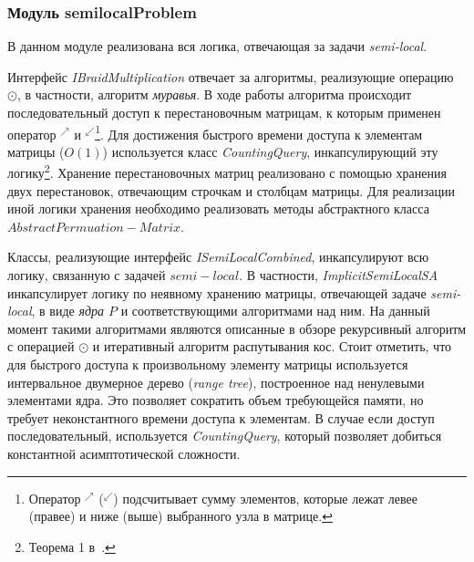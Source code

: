 \subsubsection{Модуль semilocalProblem}
В данном модуле реализована вся логика, отвечающая за задачи \emph{semi-local}.

Интерфейс \emph{IBraidMultiplication} отвечает за алгоритмы, реализующие операцию $\odot$, в частности, алгоритм \emph{муравья}.
В ходе работы алгоритма происходит последовательный доступ к перестановочным матрицам, к которым применен оператор $^{\nearrow}$ и $^{\swarrow}$\footnote{Оператор $^{\nearrow}$ ($^{\swarrow}$)  подсчитывает сумму элементов, которые лежат левее (правее) и ниже (выше) выбранного узла в матрице.}.
Для достижения быстрого времени доступа к элементам  матрицы ($O(1)$) используется
класс \emph{CountingQuery}, инкапсулирующий эту логику\footnote{Теорема 1 в~\cite{tiskin2015fast}.}.
% 
Хранение перестановочных матриц реализовано с помощью хранения двух перестановок, отвечающим строчкам и столбцам матрицы.
Для реализации иной логики хранения необходимо реализовать методы абстрактного класса $AbstractPermuation-Matrix$.

Классы, реализующие интерфейс \emph{ISemiLocalCombined}, инкапсулируют всю логику, связанную с задачей $semi-local$.
В частности, \emph{ImplicitSemiLocalSA} инкапсулирует логику по неявному хранению матрицы, отвечающей задаче \emph{semi-local}, в виде \emph{ядра $P$} и соответствующими алгоритмами над ним.
На данный момент такими алгоритмами являются описанные в обзоре рекурсивный алгоритм с операцией $\odot$ и итеративный алгоритм распутывания кос.
Стоит отметить, что для быстрого доступа к произвольному элементу матрицы  используется интервальное двумерное дерево (\emph{range tree}), построенное над ненулевыми элементами ядра.
Это позволяет сократить объем требующейся памяти, но требует неконстантного времени доступа к элементам.
В случае если доступ последовательный, используется  \emph{CountingQuery}, который позволяет добиться константной асимптотической сложности.

